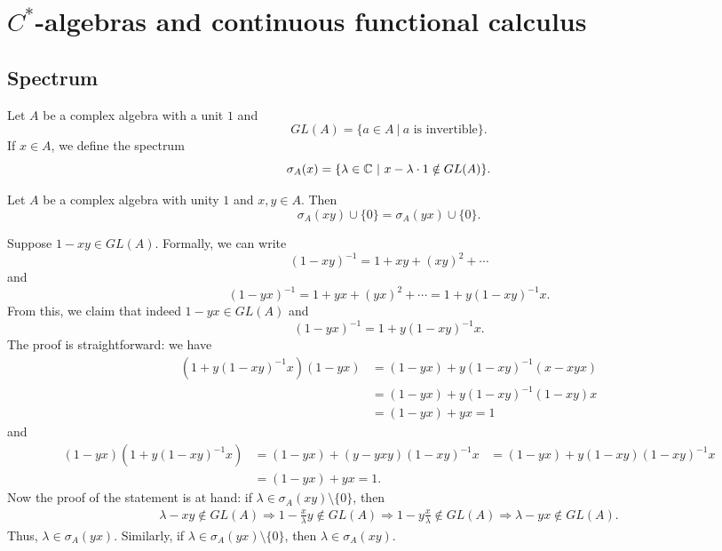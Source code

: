 \section{$C^*$-algebras and continuous functional calculus}

\subsection{Spectrum}

Let $A$ be a complex algebra with a unit $1$ and 
$$GL (A) = \{a \in A\ |\ \textrm{$a$ is invertible}\}.$$
If $x \in A$, we define the spectrum 
$$\sigma_A (x) = \{\lambda \in \mathbb {C}\ |\ x - \lambda \cdot 1 \notin GL(A)\}.$$
\begin{proposition}
  Let $A$ be a complex algebra with unity $1$ and $x, y \in A$. Then 
  $$\sigma_A (xy) \cup \{0\} = \sigma_A (yx) \cup \{0\}.$$
\end{proposition}

\begin{myproof}
  Suppose $1 - xy \in GL(A)$. Formally, we can write 
  $$(1 - xy)^{-1} = 1 + xy + (xy)^2 + \cdots$$
  and $$(1 - yx)^{-1} = 1 + yx + (yx)^2 + \cdots = 1 + y(1 - xy)^{-1} x.$$
  From this, we claim that indeed $1 - yx \in GL (A)$ and 
  $$(1 - yx)^{-1} = 1 + y(1 - xy)^{-1} x.$$ 
  The proof is straightforward: we have
  \begin{align*}
    (1 + y(1 - xy)^{-1} x)(1 - yx) &= (1 - yx) + y(1 - xy)^{-1} (x - xyx)\\
    &= (1 - yx) + y (1 - xy)^{-1} (1 - xy) x\\
    &= (1 - yx) + yx = 1
  \end{align*} 
  and 
  \begin{align*}
    (1 - yx) (1 + y(1 - xy)^{-1} x) &= (1 - yx) + (y - yxy) (1 - xy)^{-1} x
    &= (1 - yx) + y(1 - xy) (1 - xy)^{-1} x\\
    &= (1 - yx) + yx = 1.
  \end{align*}
  Now the proof of the statement is at hand: if $\lambda \in \sigma_A (xy) \setminus \{0\}$,
  then \begin{align*}
    \lambda - xy \notin GL (A) \Rightarrow 1 - \frac{x}{\lambda} y \notin GL (A) \Rightarrow 1 - y \frac{x}{\lambda} \notin GL (A) \Rightarrow \lambda - yx \notin GL (A).
  \end{align*}
  Thus, $\lambda \in \sigma_A (yx)$.
  Similarly, if $\lambda \in \sigma_A (yx) \setminus \{0\}$, then $\lambda \in \sigma_A (xy)$.
\end{myproof}

